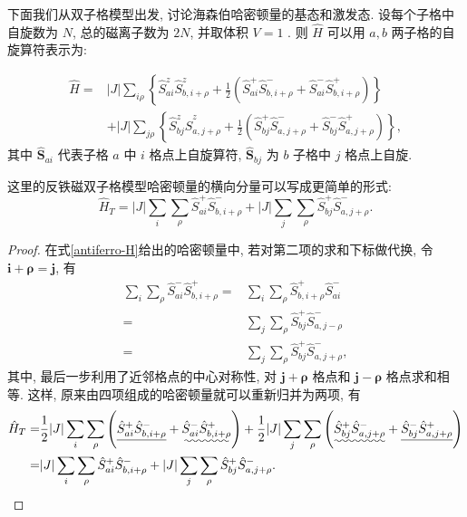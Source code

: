 下面我们从双子格模型出发, 讨论海森伯哈密顿量的基态和激发态. 设每个子格中自旋数为 $N$, 总的磁离子数为 $2 N$, 并取体积 $V=1$ . 则 $\hat H$ 可以用 $a , b$ 两子格的自旋算符表示为:

\begin{align}\label{antiferro-H}
\hat H=&|J| \sum_{i \rho}\left\{\hat{S}_{a i}^{z} \hat{S}_{b, i+\rho}^{z}+\frac{1}{2}\left(\hat{S}_{a i}^{+} \hat{S}_{b, i+\rho}^{-}+\hat{S}_{a i}^{-} \hat{S}_{b, i+\rho}^{+}\right)\right\}\nonumber\\
&+|J| \sum_{j \rho}\left\{\hat{S}_{b j}^{z} \hat{S}_{a, j+\rho}^{z}+\frac{1}{2}\left(\hat{S}_{b j}^{+} \hat{S}_{a, j+\rho}^{-}+\hat{S}_{b j}^{-} \hat{S}_{a, j+\rho}^{+}\right)\right\},
\end{align}
其中 $\hat{\boldsymbol{S}}_{a i}$ 代表子格 $a$ 中 $i$ 格点上自旋算符, $\hat{\boldsymbol{S}}_{b j}$ 为 $b$ 子格中 $j$ 格点上自旋. 
\begin{note}
    这里的反铁磁双子格模型哈密顿量的横向分量可以写成更简单的形式:
    \begin{equation}
        \hat H_T=|J|\sum_i\sum_\rho \hat{S}_{ai}^+\hat{S}_{b, i+\rho}^-+|J|\sum_j\sum_\rho \hat{S}_{bj}^+\hat{S}_{a, j+\rho}^-.
    \end{equation}
    \begin{proof}
        在式\eqref{antiferro-H}给出的哈密顿量中, 若对第二项的求和下标做代换, 令 $\boldsymbol{i}+\boldsymbol{\rho}=\boldsymbol{j}$, 有
     \begin{align}
                \sum_i\sum_\rho\hat{S}_{ai}^-\hat{S}_{b, i+\rho}^+=&\sum_i\sum_\rho\hat{S}_{b, i+\rho}^+\hat{S}_{ai}^-\nonumber\\
                =&\sum_j\sum_\rho\hat{S}_{bj}^+\hat{S}_{a, j-\rho}^-\nonumber\\
                =&\sum_j\sum_\rho\hat{S}_{bj}^+\hat{S}_{a, j+\rho}^-,
            \end{align}
        其中, 最后一步利用了近邻格点的中心对称性, 对 $\boldsymbol j+\boldsymbol \rho$ 格点和 $\boldsymbol j-\boldsymbol \rho$ 格点求和相等. 这样, 原来由四项组成的哈密顿量就可以重新归并为两项, 有
        \begin{equation}
            \begin{aligned}
                \hat{H}_T=&\frac{1}{2}|J|\sum_i\sum_\rho{\left(\uline{ \hat{S}_{ai}^+\hat{S}_{b, i+\rho}^-}+\uwave{\hat{S}_{ai}^-\hat{S}_{b, i+\rho}^+ }\right)+\frac{1}{2}|J|\sum_j\sum_\rho\left( \uwave{\hat{S}_{bj}^+\hat{S}_{a, j+\rho}^-} +\uline{\hat{S}_{bj}^-\hat{S}_{a, j+\rho}^+ }\right)}\\
                =&|J|\sum_i\sum_\rho\hat{S}_{ai}^+\hat{S}_{b, i+\rho}^-+|J|\sum_j\sum_\rho\hat{S}_{bj}^+\hat{S}_{a,j+\rho}^-.
            \end{aligned}
        \end{equation} 
    \end{proof}
\end{note}
